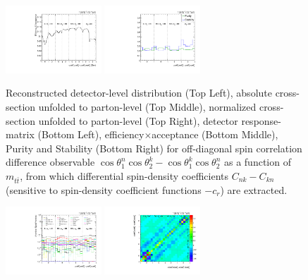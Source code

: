 \begin{refsection}
\begin{figure}[htb]
\begin{center}
 \includegraphics[width=0.32\textwidth]{fig_fullRun2UL/unfolding/combined/TotEff_c_Mnk_mttbar.pdf}
 \includegraphics[width=0.32\textwidth]{fig_fullRun2UL/unfolding/combined/PurStab_c_Mnk_mttbar.pdf} \\
\caption{Reconstructed detector-level distribution (Top Left), absolute cross-section unfolded to parton-level (Top Middle), normalized cross-section unfolded to parton-level (Top Right), detector response-matrix (Bottom Left), efficiency$\times$acceptance (Bottom Middle), Purity and Stability (Bottom Right) for off-diagonal spin correlation difference observable $\cos\theta_{1}^{n}\cos\theta_{2}^{k}-\cos\theta_{1}^{k}\cos\theta_{2}^{n}$ as a function of $m_{t\bar{t}}$, from which differential spin-density coefficients $C_{nk}-C_{kn}$ (sensitive to spin-density coefficient functions $-c_r$) are extracted.}
\label{fig:c_Mnk_mttbar}
\end{center}
\end{figure}
\clearpage
\begin{figure}[htb]
\begin{center}
 \includegraphics[width=0.32\textwidth]{fig_fullRun2UL/unfolding/combined/deltaSystCombinedlog_rebinnedB_c_Mnk_mttbar.pdf}
 \includegraphics[width=0.32\textwidth]{fig_fullRun2UL/unfolding/combined/StatCovMatrix_rebinnedB_c_Mnk_mttbar.pdf}

\end{center}
\end{figure}
\end{refsection}
